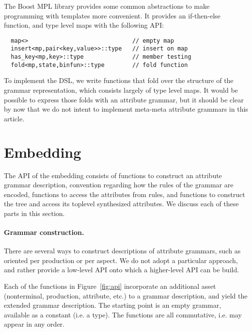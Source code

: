 \documentclass{llncs}
\begin{document}
  The Boost MPL library provides some common abstractions
  to make programming with templates more convenient.  
  It provides an if-then-else function, and
  type level maps with the following API:
  \begin{lstlisting}
  map<>                              // empty map
  insert<mp,pair<key,value>>::type   // insert on map
  has_key<mp,key>::type              // member testing
  fold<mp,state,binfun>::type        // fold function
  \end{lstlisting}
  To implement the DSL, we write functions that fold
  over the structure of the grammar representation,
  which consists largely of type level maps.
  It would be possible to express those folds with
  an attribute grammar, but it should be clear by
  now that we do not intent to implement meta-meta
  attribute grammars in this article.

\section{Embedding}
\label{sect:api}

  The API of the embedding consists of functions to
  construct an attribute grammar description,
  convention regarding how the rules of the grammar
  are encoded, functions to access the attributes
  from rules, and functions to construct the
  tree and access its toplevel synthesized attributes.
  We discuss each of these parts in this section.

  \paragraph{Grammar construction.}
  There are several ways to construct descriptions of
  attribute grammars,
  such as oriented per production or per aspect. We do not
  adopt a particular approach, and rather provide a
  low-level API onto which a higher-level API can be build.

  Each of the functions in Figure~\ref{fig:api}
  incorporate an additional asset (nonterminal,
  production, attribute, etc.) to a grammar description,
  and yield the extended
  grammar description. The starting point is an empty
  grammar, available as a constant (i.e. a type).
  The functions are all commutative, i.e. may appear
  in any order. 
\end{document}
